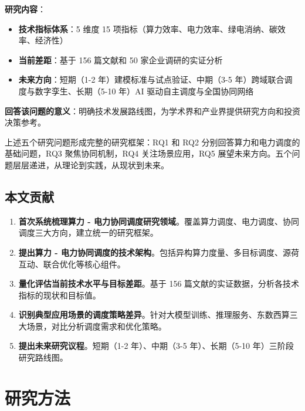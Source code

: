 \documentclass[12pt,a4paper]{article}
\begin{document}
\begin{itemize}
    \textbf{研究内容}：
    \begin{itemize}
        \item \textbf{技术指标体系}：5 维度 15 项指标（算力效率、电力效率、绿电消纳、碳效率、经济性）
        \item \textbf{当前差距}：基于 156 篇文献和 50 家企业调研的实证分析
        \item \textbf{未来方向}：短期（1-2 年）建模标准与试点验证、中期（3-5 年）跨域联合调度与数字孪生、长期（5-10 年）AI 驱动自主调度与全国协同网络
    \end{itemize}
    
    \textbf{回答该问题的意义}：明确技术发展路线图，为学术界和产业界提供研究方向和投资决策参考。
\end{itemize}

上述五个研究问题形成完整的研究框架：RQ1 和 RQ2 分别回答算力和电力调度的基础问题，RQ3 聚焦协同机制，RQ4 关注场景应用，RQ5 展望未来方向。五个问题层层递进，从理论到实践，从现状到未来。

\subsection{本文贡献}

\begin{enumerate}
    \item \textbf{首次系统梳理算力 - 电力协同调度研究领域}。覆盖算力调度、电力调度、协同调度三大方向，建立统一的研究框架。
    
    \item \textbf{提出算力 - 电力协同调度的技术架构}。包括异构算力度量、多目标调度、源荷互动、联合优化等核心组件。
    
    \item \textbf{量化评估当前技术水平与目标差距}。基于 156 篇文献的实证数据，分析各技术指标的现状和目标值。
    
    \item \textbf{识别典型应用场景的调度策略差异}。针对大模型训练、推理服务、东数西算三大场景，对比分析调度需求和优化策略。
    
    \item \textbf{提出未来研究议程}。短期（1-2 年）、中期（3-5 年）、长期（5-10 年）三阶段研究路线图。
\end{enumerate}

\section{研究方法}
\label{sec:method}
\end{document}
